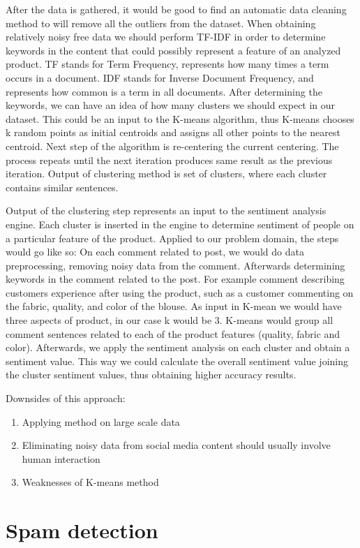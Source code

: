 After the data is gathered, it would be good to find an automatic data cleaning method to will remove all the outliers from the dataset. When obtaining relatively noisy free data we should perform TF-IDF in order to determine keywords in the content that could possibly represent a feature of an analyzed product. TF stands for Term Frequency, represents how many times a term occurs in a document. IDF stands for Inverse Document Frequency, and represents how common is a term in all documents. 
After determining the keywords, we can have an idea of how many clusters we should expect in our dataset. This could be an input to the K-means algorithm, thus K-means chooses k random points as initial centroids and assigns all other points to the nearest centroid. Next step of the algorithm is re-centering the current centering. The process repeats until the next iteration produces same result as the previous iteration. Output of clustering method is set of clusters, where each cluster contains similar sentences. 

Output of the clustering step represents an input to the sentiment analysis engine. Each cluster is inserted in the engine to determine sentiment of people on a particular feature of the product.
Applied to our problem domain, the steps would go like so:
On each comment related to post, we would do data preprocessing, removing noisy data from the comment. Afterwards determining keywords in the comment related to the post. For example comment describing customers experience after using the product, such as a customer commenting on the fabric, quality, and color of the blouse. As input in K-mean we would have three aspects of product, in our case k would be 3. K-means would group all comment sentences related to each of the product features (quality, fabric and color). Afterwards, we apply the sentiment analysis on each cluster and obtain a sentiment value. This way we could calculate the overall sentiment value joining the cluster sentiment values, thus obtaining higher accuracy results.

Downsides of this approach:
\begin{enumerate}
	\item Applying method on large scale data
	\item Eliminating noisy data from social media content should usually involve human interaction
	\item Weaknesses of K-means method
\end{enumerate}

\section{Spam detection}

